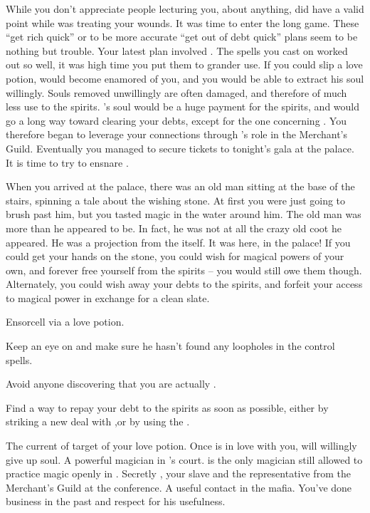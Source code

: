 \documentclass[char]{NeptuneBall}
\begin{document}
While you don't appreciate people lecturing you, about anything, \cManta{} did have a valid point while \cManta{\they} was treating your wounds. It was time to enter the long game. These ``get rich quick'' or to be more accurate ``get out of debt quick'' plans seem to be nothing but trouble. Your latest plan involved \cKing{\King} \cKing{}. The spells you cast on \cSlave{} worked out so well, it was high time you put them to grander use. If you could slip \cKing{} a love potion, \cKing{} would become enamored of you, and you would be able to extract his soul willingly. Souls removed unwillingly are often damaged, and therefore of much less use to the spirits. \cKing{}'s soul would be a huge payment for the spirits, and would go a long way toward clearing your debts, except for the one concerning \cAriel{}. You therefore began to leverage your connections through \cSlave{}'s role in the Merchant's Guild. Eventually you managed to secure tickets to tonight's gala at the palace. It is time to try to ensnare \cKing{}.

When you arrived at the palace, there was an old man sitting at the base of the stairs, spinning a tale about the wishing stone. At first you were just going to brush past him, but you tasted magic in the water around him. The old man was more than he appeared to be. In fact, he was not at all the crazy old coot he appeared. He was a projection from the \iWishingStone{\MYname} itself. It was here, in the palace! If you could get your hands on the stone, you could wish for magical powers of your own, and forever free yourself from the spirits -- you would still owe them though. Alternately, you could wish away your debts to the spirits, and forfeit your access to magical power in exchange for a clean slate.

\begin{itemz}[Goals]
  \item Ensorcell \cKing{\King} \cKing{} via a love potion.
  \item Keep an eye on \cSlave{} and make sure he hasn't found any loopholes in the control spells.
  \item Avoid anyone discovering that you are actually \cWitch{}.
  \item Find a way to repay your debt to the spirits as soon as possible, either by striking a new deal with \cAriel{},or by using the \iWishingStone{}.
\end{itemz}

\begin{contacts}
  \contact{\cKing{}} The current \cKing{\King} of \pAtlantis{} target of your love potion. Once \cKing{\they} is in love with you, \cKing{\they} will willingly give up \cKing{\them} soul.
  \contact{\cManta{}} A powerful magician in \cKing{}'s court. \cManta{\They} is the only magician still allowed to practice magic openly in \pAtlantis{}.
  \contact{\cSlave{\MYname}} Secretly \cSlave{}, your slave and the representative from the Merchant's Guild at the conference.
  \contact{\cPriest{}} A useful contact in the mafia. You've done business in the past and respect \cPriest{\them} for his usefulness.
\end{contacts}
\end{document}
